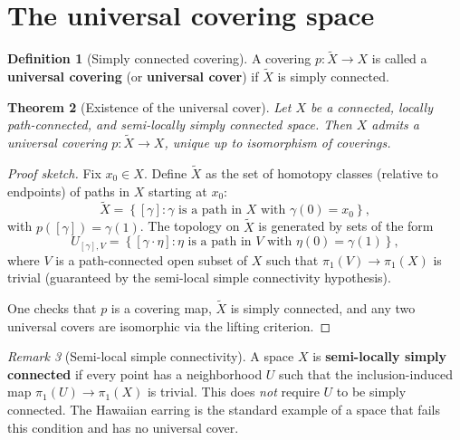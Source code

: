\documentclass[12pt,a4paper,openany]{book}
\theoremstyle{definition}
\newtheorem{definition}{Definition}[chapter]
\theoremstyle{plain}
\newtheorem{theorem}[definition]{Theorem}
\theoremstyle{remark}
\newtheorem{remark}[definition]{Remark}
\newcommand{\set}[1]{\left\{#1\right\}}
\begin{document}
\section{The universal covering space}\label{sec:universal-cover}

\begin{definition}[Simply connected covering]\label{def:universal-cover}
  A covering $p\colon \widetilde{X} \to X$ is called a \textbf{universal
  covering} (or \textbf{universal cover}) if $\widetilde{X}$ is simply
  connected.
\end{definition}

\begin{theorem}[Existence of the universal cover]\label{thm:universal-cover-existence}
  Let $X$ be a connected, locally path-connected, and semi-locally simply
  connected space.  Then $X$ admits a universal covering
  $p\colon \widetilde{X} \to X$, unique up to isomorphism of coverings.
\end{theorem}

\begin{proof}[Proof sketch]
  Fix $x_0 \in X$.  Define $\widetilde{X}$ as the set of homotopy classes
  (relative to endpoints) of paths in $X$ starting at $x_0$:
  \[
    \widetilde{X} = \set{[\gamma] : \gamma \text{ is a path in } X
      \text{ with } \gamma(0) = x_0},
  \]
  with $p([\gamma]) = \gamma(1)$.  The topology on $\widetilde{X}$ is
  generated by sets of the form
  \[
    U_{[\gamma], V} = \set{[\gamma \cdot \eta] : \eta \text{ is a path in } V
      \text{ with } \eta(0) = \gamma(1)},
  \]
  where $V$ is a path-connected open subset of $X$ such that
  $\pi_1(V) \to \pi_1(X)$ is trivial (guaranteed by the semi-local simple
  connectivity hypothesis).

  One checks that $p$ is a covering map, $\widetilde{X}$ is simply connected,
  and any two universal covers are isomorphic via the lifting criterion.
\end{proof}

\begin{remark}[Semi-local simple connectivity]\label{rem:semi-local}
  A space $X$ is \textbf{semi-locally simply connected} if every point has a
  neighborhood $U$ such that the inclusion-induced map
  $\pi_1(U) \to \pi_1(X)$ is trivial.  This does \emph{not} require $U$ to
  be simply connected.  The Hawaiian earring is the standard example of a
  space that fails this condition and has no universal cover.
\end{remark}
\end{document}
